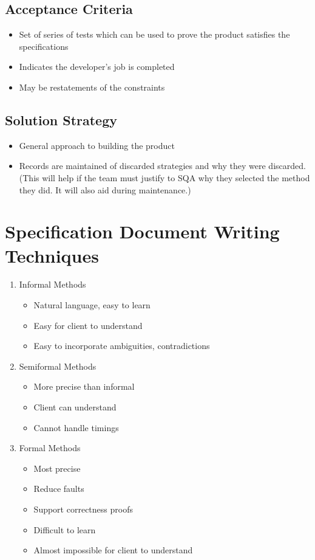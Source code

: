 \documentclass{report}
\begin{document}
			\subsection{Acceptance Criteria} %
				\begin{itemize}
					\item Set of series of tests which can be used to prove the product satisfies the specifications
					\item Indicates the developer's job is completed
					\item May be restatements of the constraints
				\end{itemize}
			\subsection{Solution Strategy}
				\begin{itemize}
					\item General approach to building the product
					\item Records are maintained of discarded strategies and why they were discarded. (This will help if the team must justify to SQA why they selected the method they did. It will also aid during maintenance.)
				\end{itemize}
		\section{Specification Document Writing Techniques}
			\begin{enumerate}
				\item Informal Methods
					\begin{itemize}
						\item Natural language, easy to learn
						\item Easy for client to understand
						\item Easy to incorporate ambiguities, contradictions
					\end{itemize}
				\item Semiformal Methods
					\begin{itemize}
						\item More precise than informal
						\item Client can understand
						\item Cannot handle timings
					\end{itemize}
				\item Formal Methods
					\begin{itemize}
						\item Most precise
						\item Reduce faults
						\item Support correctness proofs
						\item Difficult to learn
						\item Almost impossible for client to understand
					\end{itemize}
			\end{enumerate}
\end{document}
